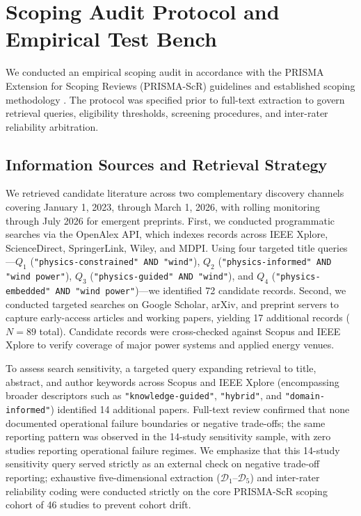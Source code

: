\section{Scoping Audit Protocol and Empirical Test Bench}
\label{sec:protocol}

We conducted an empirical scoping audit in accordance with the PRISMA Extension for Scoping Reviews (PRISMA-ScR) guidelines \cite{tricco2018} and established scoping methodology \cite{levac2010}. The protocol was specified prior to full-text extraction to govern retrieval queries, eligibility thresholds, screening procedures, and inter-rater reliability arbitration.

\subsection{Information Sources and Retrieval Strategy}
We retrieved candidate literature across two complementary discovery channels covering January 1, 2023, through March 1, 2026, with rolling monitoring through July 2026 for emergent preprints. First, we conducted programmatic searches via the OpenAlex API, which indexes records across IEEE Xplore, ScienceDirect, SpringerLink, Wiley, and MDPI. Using four targeted title queries---$Q_1$ (\texttt{"physics-constrained" AND "wind"}), $Q_2$ (\texttt{"physics-informed" AND "wind power"}), $Q_3$ (\texttt{"physics-guided" AND "wind"}), and $Q_4$ (\texttt{"physics-embedded" AND "wind power"})---we identified 72 candidate records. Second, we conducted targeted searches on Google Scholar, arXiv, and preprint servers to capture early-access articles and working papers, yielding 17 additional records ($N=89$ total). Candidate records were cross-checked against Scopus and IEEE Xplore to verify coverage of major power systems and applied energy venues. 

To assess search sensitivity, a targeted query expanding retrieval to title, abstract, and author keywords across Scopus and IEEE Xplore (encompassing broader descriptors such as \texttt{"knowledge-guided"}, \texttt{"hybrid"}, and \texttt{"domain-informed"}) identified 14 additional papers. Full-text review confirmed that none documented operational failure boundaries or negative trade-offs; the same reporting pattern was observed in the 14-study sensitivity sample, with zero studies reporting operational failure regimes. We emphasize that this 14-study sensitivity query served strictly as an external check on negative trade-off reporting; exhaustive five-dimensional extraction ($\mathcal{D}_1$--$\mathcal{D}_5$) and inter-rater reliability coding were conducted strictly on the core PRISMA-ScR scoping cohort of 46 studies to prevent cohort drift.

